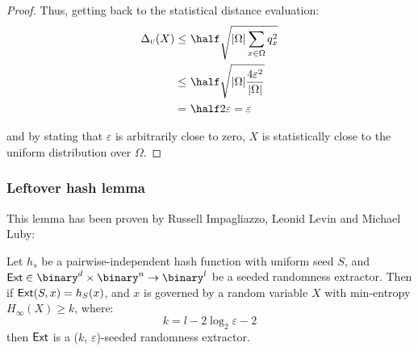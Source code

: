 \begin{proof}
    Thus, getting back to the statistical distance evaluation:
    \begin{align*}
        \sdtu(X) \leq&\ \half \sqrt{|\Omega| \sum_{x \in \Omega} q_x^2}        \\
                 \leq&\ \half \sqrt{|\Omega| \frac{4 \varepsilon^2}{|\Omega|}} \\
                    =&\ \half 2 \varepsilon = \varepsilon                      \\
    \end{align*}

    and by stating that $\varepsilon$ is arbitrarily close to zero, $X$ is statistically close to the uniform distribution over $\Omega$.
\end{proof}

\subsubsection{Leftover hash lemma}

This lemma has been proven by Russell Impagliazzo, Leonid Levin and Michael Luby:

\begin{lemma}
    Let $h_s$ be a pairwise-independent hash function with uniform seed $S$, and $\Extm \in \binary^d \times \binary^n \to \binary^l$ be a seeded randomness extractor. Then if $\textup{\textsf{Ext}}(S, x) = h_S(x)$, and $x$ is governed by a random variable $X$ with min-entropy $H_{\infty}(X) \geq k$, where:
    \[
       k = l - 2 \log_2 \varepsilon - 2
    \]
    then $\textup{\textsf{Ext}}$ is a ($k$, $\varepsilon$)-seeded randomness extractor.
\end{lemma}

